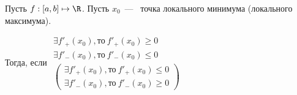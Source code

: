 \begin{lemma}
	Пусть $f: [a, b] \mapsto \R$. Пусть $x_{0}$~---~ точка локального минимума (локального максимума).
	
	Тогда, если $ \begin{gathered}
		\exists f'_{+} (x_{0}), \textrm{то} \ f'_{+} (x_{0}) \geq 0 \\
		\exists f'_{-} (x_{0}), \textrm{то} \ f'_{-} (x_{0}) \leq 0 \\
		\left(
		\begin{gathered}
			\exists f'_{+} (x_{0}), \textrm{то} \ f'_{+} (x_{0}) \leq 0 \\
			\exists f'_{-} (x_{0}), \textrm{то} \ f'_{-} (x_{0}) \geq 0			
		\end{gathered}
		\right)
	\end{gathered}$
\end{lemma}
